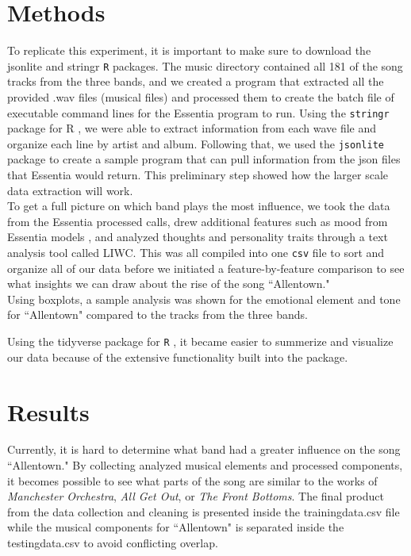 \documentclass{article}\usepackage[]{graphicx}\usepackage[]{xcolor}
\begin{document}
\begin{multicols}{2}
\section{Methods}
To replicate this experiment, it is important to make sure to download the jsonlite and stringr \texttt{R} packages. The music directory contained all 181 of the song tracks from the three bands, and we created a program that extracted all the provided .wav files (musical files) and processed them to create the batch file of executable command lines for the Essentia program to run. Using the \texttt{stringr} \citep{st} package for R , we were able to extract information from each wave file and organize each line by artist and album. Following that, we used the \texttt{jsonlite} \citep{js} package to create a sample program that can pull information from the json files that Essentia would return. This preliminary step showed how the larger scale data extraction will work. \\
\indent To get a full picture on which band plays the most influence, we took the data from the Essentia processed calls, drew additional features such as mood from Essentia models \citep{alonso2020tensorflow}, and analyzed thoughts and personality traits through a text analysis tool called LIWC. This was all compiled into one \texttt{csv} file to sort and organize all of our data before we initiated a feature-by-feature comparison to see what insights we can draw about the rise of the song ``Allentown." \\
\indent Using boxplots, a sample analysis was shown for the emotional element and tone for ``Allentown" compared to the tracks from the three bands. 

Using the tidyverse package for \texttt{R} \citep{tidyverse}, it became easier to summerize and visualize our data because of the extensive functionality built into the package. 



\section{Results}
Currently, it is hard to determine what band had a greater influence on the song ``Allentown." By collecting analyzed musical elements and processed components, it becomes possible to see what parts of the song are similar to the works of \textit{Manchester Orchestra}, \textit{All Get Out}, or \textit{The Front Bottoms}. The final product from the data collection and cleaning is presented inside the trainingdata.csv file while the musical components for ``Allentown" is separated inside the testingdata.csv to avoid conflicting overlap.
\newpage




\end{multicols}
\end{document}
